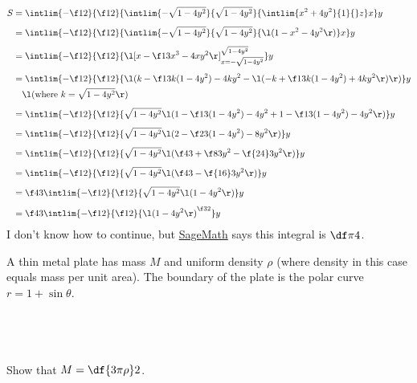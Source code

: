 \documentclass[a4paper]{article}
\begin{document}
\begin{align*}
S &= \intlim {-\f12}{\f12} {\intlim {-\sqrt{1 - 4y^2}}{\sqrt{1 - 4y^2}} {\intlim {x^2 + 4y^2}{1} {} z} x} y \\[1ex]
&= \intlim {-\f12}{\f12} {\intlim {-\sqrt{1 - 4y^2}}{\sqrt{1 - 4y^2}} {\l( 1 - x^2 - 4y^2 \r)} x} y \\[1ex]
&= \intlim {-\f12}{\f12} {{\l[ x - \f13 x^3 - 4xy^2 \r]}_{x = -\sqrt{1 - 4y^2}}^{\sqrt{1 - 4y^2}} } y \\[1ex]
&= \intlim {-\f12}{\f12} {\l( k - \f13 k (1 - 4y^2) - 4k y^2 - \l( -k + \f13 k (1 - 4y^2) + 4k y^2 \r) \r)} y \\
&\quad \l( \text{where } k = \sqrt{1 - 4y^2} \r) \\[1ex]
&= \intlim {-\f12}{\f12} {\sqrt{1 - 4y^2} \l( 1 - \f13 (1 - 4y^2) - 4 y^2 + 1 - \f13 (1 - 4y^2) - 4 y^2 \r)} y \\[1ex]
&= \intlim {-\f12}{\f12} {\sqrt{1 - 4y^2} \l( 2 - \f23 (1 - 4y^2) - 8 y^2 \r)} y \\[1ex]
&= \intlim {-\f12}{\f12} {\sqrt{1 - 4y^2} \l( \f43 + \f83 y^2 - \f{24}3 y^2 \r)} y \\[1ex]
&= \intlim {-\f12}{\f12} {\sqrt{1 - 4y^2} \l( \f43 - \f{16}3 y^2 \r)} y \\[1ex]
&= \f43 \intlim {-\f12}{\f12} {\sqrt{1 - 4y^2} \l(1 - 4y^2 \r)} y \\[1ex]
&= \f43 \intlim {-\f12}{\f12} {{\l(1 - 4y^2 \r)}^{\f32}} y
\end{align*}
I don't know how to continue, but \href{https://www.sagemath.org/}{SageMath} says this integral is $\df\pi4$.


\begin{questionbody}
A thin metal plate has mass $M$ and uniform density $\rho$ (where density in this case equals mass per unit area). The boundary of the plate is the polar curve $r = 1 + \sin \theta$.
\end{questionbody}

\subsection{~} %

\begin{questionbody}
Show that $M = \df{3 \pi \rho}2$.
\end{questionbody}
\end{document}
